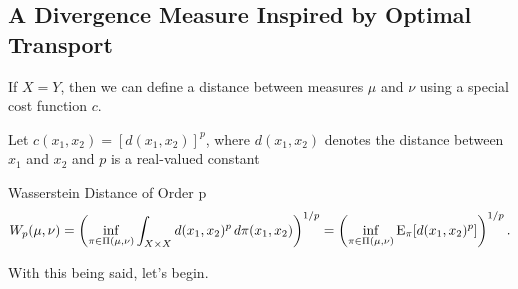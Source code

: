\subsection*{A Divergence Measure Inspired by Optimal Transport}
If $X=Y$, then we can define a distance between measures $\mu$ and $\nu$ using a special cost function $c$. 

Let $c(x_1,x_2) = [d(x_1,x_2)]^p$, where $d(x_1,x_2)$ denotes the distance between $x_1$ and $x_2$ and $p$ is a real-valued constant

\begin{definition}{Wasserstein Distance of Order p}
	\[
	W_p(\mu,\nu) = \left( \inf_{\pi\in \Pi(\mu,\nu)} \int_{X\times X} d(x_1,x_2)^p \,d\pi(x_1,x_2)\right)^{1/p} = \left( \inf_{\pi\in \Pi(\mu,\nu)} \mathrm{E}_{\pi}[d(x_1,x_2)^p] \right)^{1/p} .
	\]
\end{definition}

With this being said, let's begin.